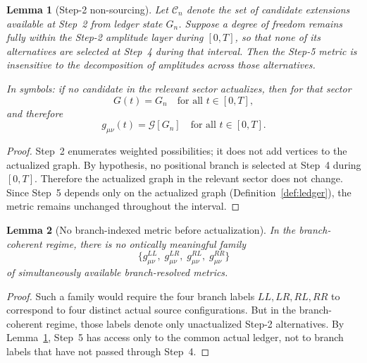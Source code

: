 \documentclass[12pt,a4paper]{article}
\newtheorem{lemma}{Lemma}[section]
\begin{document}
\begin{lemma}[Step-2 non-sourcing]
\label{lem:nonsource}
Let $\mathcal{C}_n$ denote the set of candidate extensions available
at Step~2 from ledger state $G_n$. Suppose a degree of freedom
remains fully within the Step-2 amplitude layer during $[0,T]$, so
that none of its alternatives are selected at Step~4 during that
interval. Then the Step-5 metric is insensitive to the decomposition
of amplitudes across those alternatives.

In symbols: if no candidate in the relevant sector actualizes, then
for that sector
\begin{equation}
G(t) = G_n \quad \text{for all } t \in [0,T],
\end{equation}
and therefore
\begin{equation}
g_{\mu\nu}(t) = \mathcal{G}[G_n] \quad \text{for all } t \in [0,T].
\end{equation}
\end{lemma}

\begin{proof}
Step~2 enumerates weighted possibilities; it does not add vertices to
the actualized graph. By hypothesis, no positional branch is selected
at Step~4 during $[0,T]$. Therefore the actualized graph in the
relevant sector does not change. Since Step~5 depends only on the
actualized graph (Definition~\ref{def:ledger}), the metric remains
unchanged throughout the interval.
\end{proof}

\begin{lemma}[No branch-indexed metric before actualization]
\label{lem:nobranch}
In the branch-coherent regime, there is no ontically meaningful
family
\begin{equation}
\{g^{LL}_{\mu\nu},\; g^{LR}_{\mu\nu},\;
g^{RL}_{\mu\nu},\; g^{RR}_{\mu\nu}\}
\end{equation}
of simultaneously available branch-resolved metrics.
\end{lemma}

\begin{proof}
Such a family would require the four branch labels $LL, LR, RL, RR$
to correspond to four distinct actual source configurations. But in
the branch-coherent regime, those labels denote only unactualized
Step-2 alternatives. By Lemma~\ref{lem:nonsource}, Step~5 has access
only to the common actual ledger, not to branch labels that have not
passed through Step~4.
\end{proof}
\end{document}
